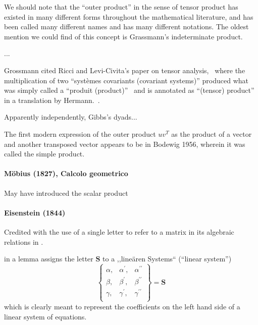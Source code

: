 We should note that the ``outer product'' in the sense of tensor product has existed in many different forms throughout the mathematical literature, and has been called many different names and has many different notations. The oldest mention we could find of this concept is Grassmann's indeterminate product.

...

Grossmann cited Ricci and Levi-Civita's paper on tensor analysis,~\cite{Ricci1900} where the multiplication of two ``systèmes covariants (covariant systems)'' produced what was simply called a ``produit (product)''~\cite[p. 133]{Ricci1900} and is annotated as ``(tensor) product'' in a translation by Hermann.~\cite[p. 28]{Hermann1975}.

Apparently independently, Gibbs's dyads...


The first modern expression of the outer product $u v^T$ as the product of a vector and another transposed vector appears to be in Bodewig 1956\cite{Bodewig1956}, wherein it was called the simple product. 



\paragraph{Möbius (1827), Calcolo geometrico}

May have introduced the scalar product

\paragraph{Eisenstein (1844)~\cite{Eisenstein1844}}

Credited with the use of a single letter to refer to a matrix in its algebraic relations in \cite{Dorier1995}.

\cite[p. 327]{Eisenstein1844} in a lemma assigns the letter $\boldsymbol S$ to a ,,lineären Systems``
(``linear system'')
\[
\begin{Bmatrix}
\alpha, & \alpha^\prime, & \alpha^{\prime\prime} \\
\beta, & \beta^\prime, & \beta^{\prime\prime} \\
\gamma, & \gamma^\prime, & \gamma^{\prime\prime} \\
\end{Bmatrix} = \boldsymbol S
\]
which is clearly meant to represent the coefficients on the left hand side of a
linear system of equations.

